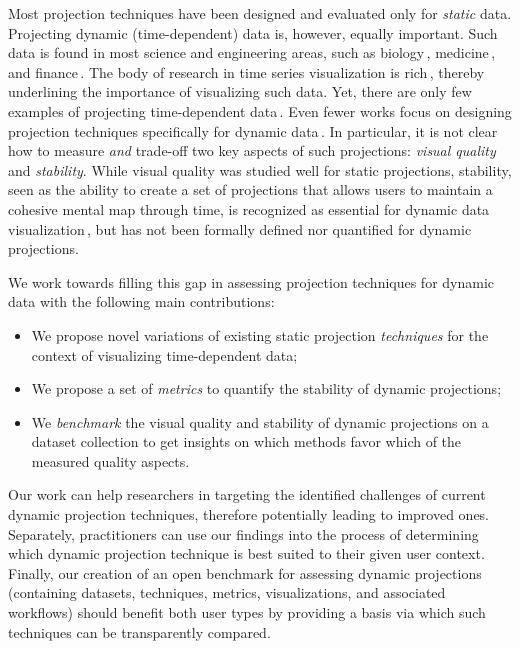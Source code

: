 Most projection techniques have been designed and evaluated only for \emph{static} data. Projecting dynamic (time-dependent) data is, however, equally important. Such data is found in most science and engineering areas, such as biology\,\citep{Teo2017}, medicine\,\citep{GRILLENZONI2019134}, and finance\,\citep{KRAPL2019101506}. The body of research in time series visualization is rich\,\citep{time0}, thereby underlining the importance of visualizing such data. Yet, there are only few examples of projecting time-dependent data\,\citep{Hu2010,Mao2007,Ward2011,bws12,Nguyen2017,Jackle2016}. Even fewer works focus on designing projection techniques specifically for dynamic data\,\citep{Rauber2016,Fujiwara2019}. In particular, it is not clear how to measure \emph{and} trade-off two key aspects of such projections: \emph{visual quality} and \emph{stability}. While visual quality was studied well for static projections, stability, seen as the ability to create a set of projections that allows users to maintain a cohesive mental map through time, is recognized as essential for dynamic data visualization\,\citep{Archambault2011,Brehmer2019ACE}, but has not been formally defined nor quantified for dynamic projections.

We work towards filling this gap in assessing projection techniques for dynamic data with the following main contributions:
\begin{itemize}
  \item We propose novel variations of existing static projection \emph{techniques} for the context of visualizing time-dependent data;
  \item We propose a set of \emph{metrics} to quantify the stability of dynamic projections;
  \item We \emph{benchmark} the visual quality and stability of dynamic projections on a dataset collection to get insights on which methods favor which of the measured quality aspects.
\end{itemize}

Our work can help researchers in targeting the identified challenges of current dynamic projection techniques, therefore potentially leading to improved ones. Separately, practitioners can use our findings into the process of determining which dynamic projection technique is best suited to their given user context. Finally, our creation of an open benchmark for assessing dynamic projections (containing datasets, techniques, metrics, visualizations, and associated workflows) should benefit both user types by providing a basis via which such techniques can be transparently compared.

